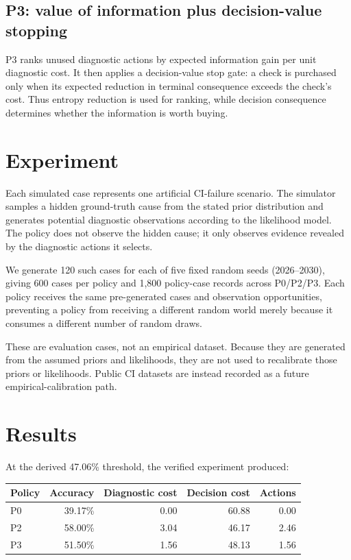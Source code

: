 \documentclass[11pt]{article}
\begin{document}
\subsection{P3: value of information plus decision-value stopping}
P3 ranks unused diagnostic actions by expected information gain per unit diagnostic cost. It then applies a decision-value stop gate: a check is purchased only when its expected reduction in terminal consequence exceeds the check's cost. Thus entropy reduction is used for ranking, while decision consequence determines whether the information is worth buying.

\section{Experiment}
Each simulated case represents one artificial CI-failure scenario. The simulator samples a hidden ground-truth cause from the stated prior distribution and generates potential diagnostic observations according to the likelihood model. The policy does not observe the hidden cause; it only observes evidence revealed by the diagnostic actions it selects.

We generate 120 such cases for each of five fixed random seeds (2026--2030), giving 600 cases per policy and 1,800 policy-case records across P0/P2/P3. Each policy receives the same pre-generated cases and observation opportunities, preventing a policy from receiving a different random world merely because it consumes a different number of random draws.

These are evaluation cases, not an empirical dataset. Because they are generated from the assumed priors and likelihoods, they are not used to recalibrate those priors or likelihoods. Public CI datasets are instead recorded as a future empirical-calibration path.

\section{Results}
At the derived 47.06\% threshold, the verified experiment produced:

\begin{center}
\begin{tabular}{lrrrr}
\toprule
Policy & Accuracy & Diagnostic cost & Decision cost & Actions\\
\midrule
P0 & 39.17\% & 0.00 & 60.88 & 0.00\\
P2 & 58.00\% & 3.04 & 46.17 & 2.46\\
P3 & 51.50\% & 1.56 & 48.13 & 1.56\\
\bottomrule
\end{tabular}
\end{center}
\end{document}
